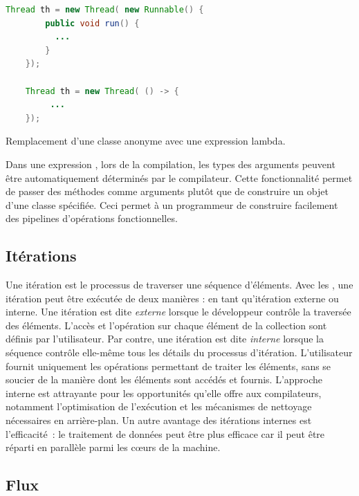 \begin{Listing}[tbp]
\begin{lstlisting}[language=java]
	Thread th = new Thread( new Runnable() {
		public void run() {
          ...
		}
	});

	Thread th = new Thread( () -> {
         ...
	});
\end{lstlisting}
\caption{Remplacement d'une classe anonyme avec une expression lambda.}
\label{lambdaAsFonctionalInterface}
\end{Listing}

Dans une expression , lors de la compilation, les types des arguments peuvent \^etre automatiquement d\'etermin\'es par le compilateur. Cette fonctionnalit\'e permet de passer des m\'ethodes comme arguments plut\^ot que de construire un objet d'une classe sp\'ecifi\'ee. Ceci permet \`a un programmeur de construire facilement des pipelines d'op\'erations fonctionnelles.


\subsection{It\'erations}

Une it\'eration est le processus de traverser une s\'equence d'\'el\'ements. Avec les , une it\'eration peut \^etre ex\'ecut\'ee de deux mani\`eres : en tant qu'it\'eration externe ou interne. Une it\'eration est dite \emph{externe} lorsque le d\'eveloppeur contr\^ole la travers\'ee des \'el\'ements.  L'acc\`es et l'op\'eration sur chaque \'el\'ement de la collection sont d\'efinis par l'utilisateur. Par contre, une it\'eration est dite \emph{interne} lorsque la s\'equence contr\^ole elle-m\^eme tous les d\'etails du processus d'it\'eration. L'utilisateur fournit uniquement les op\'erations permettant de traiter les \'el\'ements, sans se soucier de la mani\`ere dont les \'el\'ements sont acc\'ed\'es et fournis.
L'approche interne est attrayante pour les opportunit\'es qu'elle offre aux compilateurs, notamment l'optimisation de l'exécution et les m\'ecanismes de nettoyage n\'ecessaires en arri\`ere-plan. Un autre avantage des it\'erations internes est l'efficacit\'e~: le traitement de donn\'ees peut \^etre plus efficace car il peut \^etre r\'eparti en parall\`ele parmi les cœurs de la machine.


\subsection{Flux}


